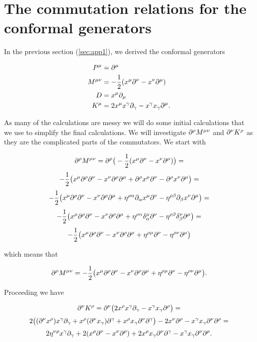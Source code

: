 \section{The commutation relations for the conformal generators \label{sec:comm}}
In the previous section (\ref{sec:app1}),  we derived the conformal generators

\begin{align}
    P^\mu&= \partial^\mu  \label{eq:comP}
    \\
    M^{\mu \nu}&=-\frac{1}{2}(x^\mu\partial^\nu-x^\nu\partial^\mu) \label{eq:comMM}
    \\
    D&=x^\mu \partial_\mu \label{eq:comD}
    \\
    K^\mu &=2x^\mu x^\gamma \partial_\gamma -x^\gamma x_\gamma \partial^\mu. \label{eq:comK}
\end{align}

As many of the calculations are messy we will do some initial calculations that we use to simplify the final calculations. We will investigate $\partial^\rho M^{\mu \nu}$ and $\partial^\nu K^\rho$ as they are the complicated parts of the commutators. We start with



    $$
    \partial^\rho M^{\mu \nu} = \partial^\rho\big(-\frac{1}{2}(  x^\mu\partial^\nu - x^\nu\partial^\mu)\big)=
    $$$$
    -\frac{1}{2} \big( x^\mu \partial ^\rho \partial^\nu 
    -x^\nu \partial ^\rho \partial^\mu 
    +\partial^\rho x^\mu \partial^\nu
    -\partial^\rho x^\nu \partial^\mu \big)=
    $$$$
    -\frac{1}{2}\big( x^\mu \partial ^\rho \partial^\nu 
    -x^\nu \partial ^\rho \partial^\mu
    +\eta^{\rho \alpha}\partial_\alpha x^\mu \partial^\nu
    -\eta^{\rho \beta}\partial_\beta x^\nu \partial^\mu\big)=
    $$$$
    -\frac{1}{2}\big( x^\mu \partial ^\rho \partial^\nu 
    -x^\nu \partial ^\rho \partial^\mu
    +\eta^{\rho \alpha} \delta^\mu _\alpha \partial^\nu 
    -\eta^{\rho \beta} \delta^\nu _\beta \partial^\mu \big)=
    $$$$
    -\frac{1}{2}\big( x^\mu \partial ^\rho \partial^\nu 
    -x^\nu \partial ^\rho \partial^\mu
    +\eta^{\rho \mu} \partial^\nu
    -\eta^{\rho \nu} \partial^\mu \big)
    $$


which means that 

\begin{equation} \label{eq:pM1}
    \partial^\rho M^{\mu \nu}=
    -\frac{1}{2}\big( x^\mu \partial ^\rho \partial^\nu 
    -x^\nu \partial ^\rho \partial^\mu
    +\eta^{\rho \mu} \partial^\nu
    -\eta^{\rho \nu} \partial^\mu \big).
\end{equation}

Proceeding we have

    $$
    \partial^\nu K^\rho=\partial^\nu\big(2x^\rho x^\gamma \partial_\gamma - x^\gamma x_\gamma \partial^\rho\big)=
    $$$$
    2\big((\partial^\nu x^\rho) x^{\gamma} \partial_\gamma 
    +x^\rho (\partial^\nu x_\gamma)\partial^\gamma
    +x^\rho x_\gamma \partial^\nu\partial^\gamma\big)
    -2x^\nu\partial^\rho
    -x^\gamma x_\gamma \partial^\nu \partial^\rho=
    $$$$
    2\eta^{\nu \rho}x^\gamma \partial_\gamma
    + 2(x^\rho \partial^\nu-x^\nu\partial^\rho)
    + 2x^\rho x_\gamma \partial^\nu \partial^\gamma
    - x^\gamma x_\gamma \partial^\nu \partial^\rho.
    $$

